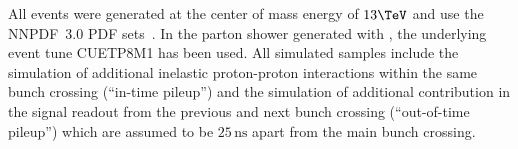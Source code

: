All events were generated at the center of mass 
energy of $13\TeV$ and use the NNPDF~3.0 PDF sets~\cite{Ball:2014uwa}.
In the parton shower generated with \PYTHIA, the underlying event tune CUETP8M1 has been used.
All simulated samples include the simulation of additional inelastic proton-proton interactions
within the same bunch crossing (``in-time pileup'') and the simulation
of additional contribution in the signal readout from the previous and next bunch crossing (``out-of-time pileup'')
which are assumed to be $25\,\text{ns}$ apart from the main bunch crossing.
